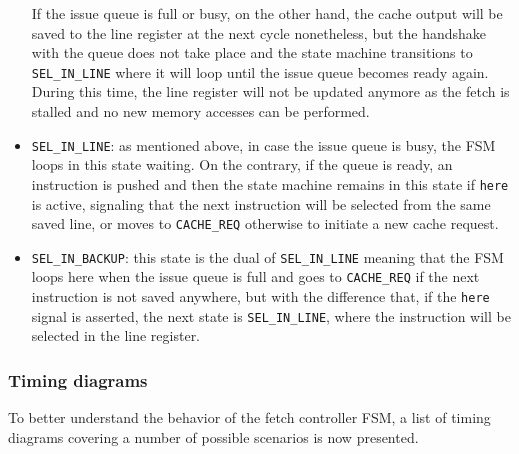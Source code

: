 \begin{itemize}
  If the issue queue is full or busy, on the other hand, the cache output will be saved to the line register at the next cycle nonetheless, but the handshake with the queue does not take place and the state machine transitions to \texttt{SEL\_IN\_LINE} where it will loop until the issue queue becomes ready again. During this time, the line register will not be updated anymore as the fetch is stalled and no new memory accesses can be performed. 
  \item \texttt{SEL\_IN\_LINE}: as mentioned above, in case the issue queue is busy, the \acs{FSM} loops in this state waiting. On the contrary, if the queue is ready, an instruction is pushed and then the state machine remains in this state if \texttt{here} is active, signaling that the next instruction will be selected from the same saved line, or moves to \texttt{CACHE\_REQ} otherwise to initiate a new cache request.
  \item \texttt{SEL\_IN\_BACKUP}: this state is the dual of \texttt{SEL\_IN\_LINE} meaning that the \acs{FSM} loops here when the issue queue is full and goes to \texttt{CACHE\_REQ} if the next instruction is not saved anywhere, but with the difference that, if the \texttt{here} signal is asserted, the next state is \texttt{SEL\_IN\_LINE}, where the instruction will be selected in the line register.
\end{itemize}

\subsubsection{Timing diagrams}\label{sec:frontend_timings}
To better understand the behavior of the fetch controller \acs{FSM}, a list of timing diagrams covering a number of possible scenarios is now presented.

